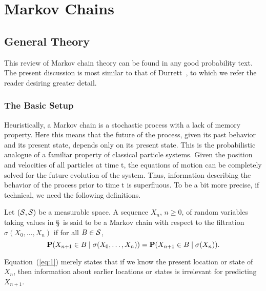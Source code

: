 \chapter{Markov Chains}

\section{General Theory}
\label{sec:general-theory}
This review of Markov chain theory can be found in any good probability text. The present
discussion is most similar to that of Durrett~\cite{Durret:1996}, to which we
refer the reader desiring greater detail. 

\subsection{The Basic Setup}

Heuristically, a Markov chain is a stochastic process with a lack of memory property. Here
this means that the future of the process, given its past behavior and its present state, depends only
on its present state. This is the probabilistic analogue of a familiar property of classical particle
systems. Given the position and velocities of all particles at time t, the equations of motion can be
completely solved for the future evolution of the system. Thus, information describing the behavior
of the process prior to time t is superﬂuous. To be a bit more precise, if technical, we need the
following definitions.

\begin{definition}
Let $(\S, \S)$ be a measurable space. A sequence $X_n$, $n\geq 0$, of random variables
taking values in \S\ is said to be a Markov chain with respect to the filtration 
$\sigma(X_0, \dots, X_{n})$ if for all $B \in \S$,
\begin{equation}
\label{eq:1}
\bP(X_{n+1} \in B \mid \sigma(X_0, \dots, X_{n}))
=\bP(X_{n+1} \in B \mid \sigma(X_{n})).
\end{equation}
\end{definition}
Equation~(\ref{eq:1}) merely states that if we know the present location or state of $X_{n}$,
then information about earlier locations or states is irrelevant for predicting $X_{n+1}$.

